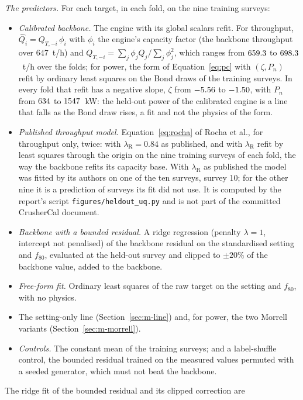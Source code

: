 \emph{The predictors.} For each target, in each fold, on the nine training surveys:
\begin{itemize}
\item \emph{Calibrated backbone.} The engine with its global scalars refit. For throughput, $\hat Q_i=Q_{T,-i}\,\phi_i$ with $\phi_i$ the engine's
capacity factor (the backbone throughput over $647$~t/h) and $Q_{T,-i}=\sum_j\phi_jQ_j/\sum_j\phi_j^2$, which ranges from $659.3$ to
$698.3$~t/h over the folds; for power, the form of Equation~\eqref{eq:pc} with $(\zeta,P_n)$ refit by ordinary least squares on the Bond
draws of the training surveys. In every fold that refit has a negative slope, $\zeta$ from $-5.56$ to $-1.50$, with $P_n$ from
$634$ to $1547$~kW: the held-out power of the calibrated engine is a line that falls as the Bond draw rises, a fit and not the
physics of the form.
\item \emph{Published throughput model.} Equation~\eqref{eq:rocha} of Rocha et al., for throughput only, twice: with $\lambda_{\mathrm R}=0.84$ as
published, and with $\lambda_{\mathrm R}$ refit by least squares through the origin on the nine training surveys of each fold, the way the backbone
refits its capacity base. With $\lambda_{\mathrm R}$ as published the model was fitted by its authors on one of the ten surveys, survey 10; for the
other nine it is a prediction of surveys its fit did not use. It is computed by the report's script \texttt{figures/\allowbreak{}heldout\_uq.py}
and is not part of the committed CrusherCal document.
\item \emph{Backbone with a bounded residual.} A ridge regression (penalty $\lambda=1$, intercept not penalised) of the backbone residual on the
standardised setting and $f_{80}$, evaluated at the held-out survey and clipped to $\pm20\%$ of the backbone value, added to the backbone.
\item \emph{Free-form fit.} Ordinary least squares of the raw target on the setting and $f_{80}$, with no physics.
\item The setting-only line (Section~\ref{sec:m-line}) and, for power, the two Morrell variants (Section~\ref{sec:m-morrell}).
\item \emph{Controls.} The constant mean of the training surveys; and a label-shuffle control, the bounded residual trained on the measured values
permuted with a seeded generator, which must not beat the backbone.
\end{itemize}
The ridge fit of the bounded residual and its clipped correction are
